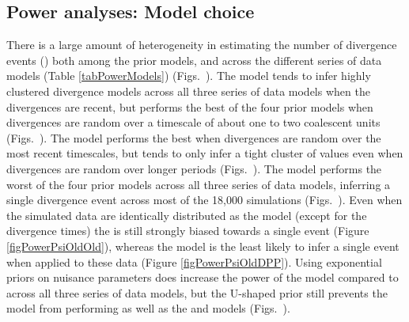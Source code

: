 \documentclass[letterpaper,12pt]{article}
\begin{document}
\begin{linenumbers}
\subsection*{Power analyses: Model choice}
There is a large amount of heterogeneity in estimating the number of divergence
events (\divTimeNum) both among the prior models, and across the different
series of data models (Table \ref{tabPowerModels}) (Figs.\
).
The \modelDPP model tends to infer highly clustered divergence models across
all three series of data models when the divergences are recent, but performs
the best of the four prior models  when divergences are random over a timescale
of about one to two coalescent units (Figs.\
).
The \modelUniform model performs the best when divergences are random
over the most recent timescales, but tends to only infer a tight
cluster of \divTimeNum values even when divergences are random
over longer periods (Figs.\
).
The \modelOld model performs the worst of the four prior models across
all three series of data models, inferring a single divergence event across
most of the 18,000 simulations (Figs.\
).
Even when the simulated data are identically distributed as the \modelOld model
(except for the divergence times) the \modelOld is still strongly biased
towards a single event (Figure \ref{figPowerPsiOldOld}), whereas the \modelDPP
model is the least likely to infer a single event when applied to these data
(Figure \ref{figPowerPsiOldDPP}).
Using exponential priors on nuisance parameters does increase the power
of the \modelUshaped model compared to \modelOld across all three series
of data models, but the U-shaped prior still prevents the model
from performing as well as the \modelDPP and \modelUniform models (Figs.\
).


\end{linenumbers}
\end{document}
